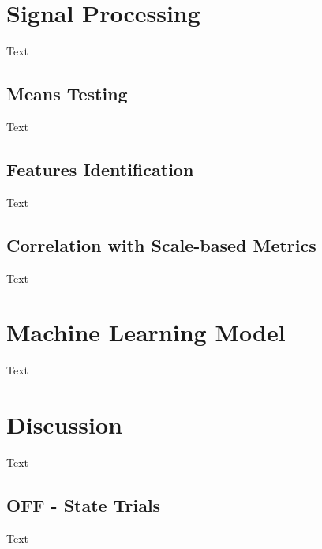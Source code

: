 \section{Signal Processing}
\label{sec:signalProcessing}
Text
\subsection{Means Testing}
\label{subsec:meansTesting}
Text
\subsection{Features Identification}
\label{subsec:featuresIdentification}
Text
\subsection{Correlation with Scale-based Metrics}
\label{subsec:correlation}
Text
\section{Machine Learning Model}
\label{sec:machineLearning}
Text
\section{Discussion}
\label{sec:discussion}
Text
\subsection{OFF - State Trials}
\label{subsec:offState}
Text
